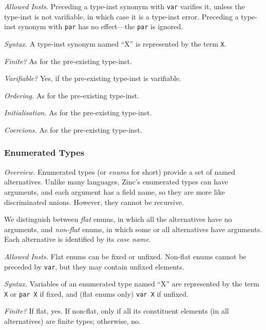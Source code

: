 \documentclass[10pt]{scrartcl}
\newcommand{\TyThing}[1]{\vspace{1.2mm}\noindent\emph{#1} }
\newcommand{\TyOverview}{\TyThing{Overview.}}
\newcommand{\TyInsts}{\TyThing{Allowed Insts.}}
\newcommand{\TySyntax}{\TyThing{Syntax.}}
\newcommand{\TyFiniteType}{\TyThing{Finite?}}
\newcommand{\TyVarifiable}{\TyThing{Varifiable?}}
\newcommand{\TyOrdering}{\TyThing{Ordering.}}
\newcommand{\TyInit}{\TyThing{Initialisation.}}
\newcommand{\TyCoercions}{\TyThing{Coercions.}}
\begin{document}
{\TyInsts
Preceding a type-inst synonym with \texttt{var} varifies it, unless the
type-inst is not varifiable, in which case it is a type-inst error.
Preceding a type-inst synonym with \texttt{par} has no effect---the
\texttt{par} is ignored.

\TySyntax
A type-inst synonym named ``X'' is represented by the term \texttt{X}.

\TyFiniteType
As for the pre-existing type-inst.

\TyVarifiable
Yes, if the pre-existing type-inst is varifiable.

\TyOrdering
As for the pre-existing type-inst.

\TyInit
As for the pre-existing type-inst.

\TyCoercions
As for the pre-existing type-inst.

\subsubsection{Enumerated Types}
        \label{Enumerated Types}
\TyOverview
Enumerated types (or \emph{enums} for short) provide a set of named
alternatives.  Unlike many languages, Zinc's enumerated types can have
arguments, and each argument has a field name, so they are more like
discriminated unions.  However, they cannot be recursive.

We distinguish between \emph{flat} enums, in which all the alternatives have
no arguments, and \emph{non-flat} enums, in which some or all alternatives
have arguments.  Each alternative is identified by its \emph{case name}.

\TyInsts
Flat enums can be fixed or unfixed.  Non-flat enums cannot be preceded by
\texttt{var}, but they may contain unfixed elements.

\TySyntax
Variables of an enumerated type named ``X'' are represented by the term
\texttt{X} or \texttt{par X} if fixed, and (flat enums only) \texttt{var X}
if unfixed.

\TyFiniteType
If flat, yes.  If non-flat, only if all its constituent elements (in all
alternatives) are finite types;  otherwise, no.

}
\end{document}
